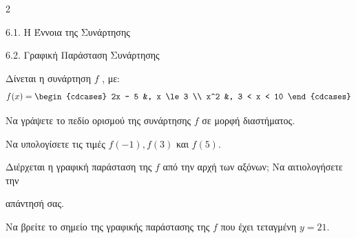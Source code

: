 \begin{ylh}{2}
    \item 6.1. Η Έννοια της Συνάρτησης
    \item 6.2. Γραφική Παράσταση Συνάρτησης
\end{ylh}
Δίνεται η συνάρτηση $f$ , με: $$f(x) = \begin{cdcases} 2x - 5 &, x \le 3 \\ x^2 &, 3 < x < 10 \end{cdcases}$$

\begin{alist}
\item Να γράψετε το πεδίο ορισμού της συνάρτησης $f$ σε μορφή διαστήματος. 
\item Να υπολογίσετε τις τιμές $f(-1), f(3)$ και $f(5)$. 
\item Διέρχεται η γραφική παράσταση της $f$ από την αρχή των αξόνων; Να αιτιολογήσετε την

απάντησή σας. 
\item Να βρείτε το σημείο της γραφικής παράστασης της $f$ που έχει τεταγμένη $y = 21$. 
\end{alist}

